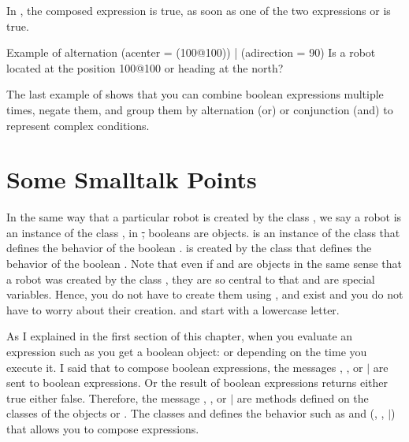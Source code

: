 In , the composed expression is true, as soon as one of the two expressions  or  is  true. 


\begin{scriptwithtitle}{Example of alternation}\label{src:alternative}
(a\Turtle center = (100@100)) | (a\Turtle direction = 90)
\textrm{Is a robot located at the position 100@100 or heading at the north?}
\end{scriptwithtitle}

The last example of  shows that you can combine boolean expressions multiple times, negate them, and group them by alternation (or)  or conjunction (and) to represent complex conditions. 


\section{Some Smalltalk Points}
In the same way that a particular robot is created by the class , we say a robot is an instance of the class , in \st, booleans are objects.  is an instance of the class  that defines the behavior of the boolean .  is created by the class  that defines the behavior of the boolean .  Note that even if  and  are objects in the same sense that a robot was created by the class \ct{\Turtle}, they are so central to \st that  and  are special variables. Hence, you do not have to create them using ,  and  exist and you do not have to worry about their creation.  and  start with a lowercase letter. 
 
As I explained in the first section of this chapter, when you evaluate an expression such as  you get a boolean object:  or  depending on the time you execute it.  I said that to compose boolean expressions, the messages \ct{\&}, ,  or \texttt{$\mid$} are sent to boolean expressions. Or the result of boolean expressions returns either true either false. Therefore, the message \ct{\&}, ,  or \texttt{$\mid$} are methods defined on the classes of  the objects  or . The classes  and  defines the behavior such as and (\index{\&}\ct{\&}, 
,  \index{$\mid$}\texttt{$\mid$})  that allows you to compose expressions. 

